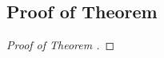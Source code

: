 \documentclass[journal]{IEEEtran}
\newtheorem*{proof}{\textbf{Proof}}
\begin{document}
	\subsection{Proof of Theorem }
	\begin{proof}[Proof of Theorem ]
		
		
	\end{proof}
	
	
	
	
	
	
\end{document}
